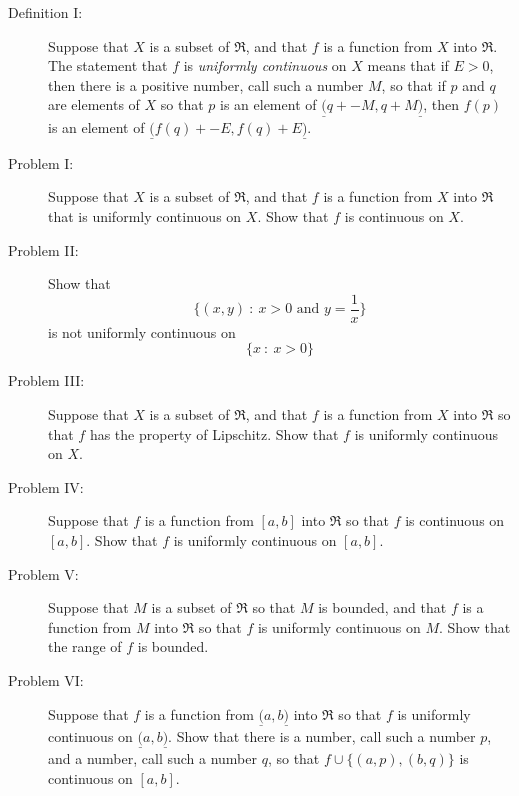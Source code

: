 \documentclass{article}
\begin{document}
\begin{description}

  \item[Definition I:] Suppose that $X$ is a subset of $\Re$, and that $f$ is a function from $X$ into $\Re$. The statement that $f$ is \emph{uniformly continuous} on $X$ means that if $E > 0$, then there is a positive number, call such a number $M$, so that if $p$ and $q$ are elements of $X$ so that $p$ is an element of $\underline{(} q + -M, q + M \underline{)}$, then $f(p)$ is an element of $\underline{(} f(q) + -E, f(q) + E \underline{)}$.

  \item[Problem I:] Suppose that $X$ is a subset of $\Re$, and that $f$ is a function from $X$ into $\Re$ that is uniformly continuous on $X$. Show that $f$ is continuous on $X$.

  \item[Problem II:] Show that 
    \begin{equation*}
    \{ (x,y)\ :\ x > 0 \text{ and } y = \frac{1}{x} \}
    \end{equation*}
    is not uniformly continuous on 
    \begin{equation*}
    \{ x\ :\ x > 0 \}
    \end{equation*}

  \item[Problem III:] Suppose that $X$ is a subset of $\Re$, and that $f$ is a function from $X$ into $\Re$ so that $f$ has the property of Lipschitz. Show that $f$ is uniformly continuous on $X$.

  \item[Problem IV:] Suppose that $f$ is a function from $[a,b]$ into $\Re$ so that $f$ is continuous on $[a,b]$. Show that $f$ is uniformly continuous on $[a,b]$.

  \item[Problem V:] Suppose that $M$ is a subset of $\Re$ so that $M$ is bounded, and that $f$ is a function from $M$ into $\Re$ so that $f$ is uniformly continuous on $M$. Show that the range of $f$ is bounded.

  \item[Problem VI:] Suppose that $f$ is a function from $\underline{(} a,b \underline{)}$ into $\Re$ so that $f$ is uniformly continuous on $\underline{(} a,b \underline{)}$. Show that there is a number, call such a number $p$, and a number, call such a number $q$, so that $f \cup \{ (a,p),(b,q) \}$ is continuous on $[a,b]$.


\end{description}
\end{document}
